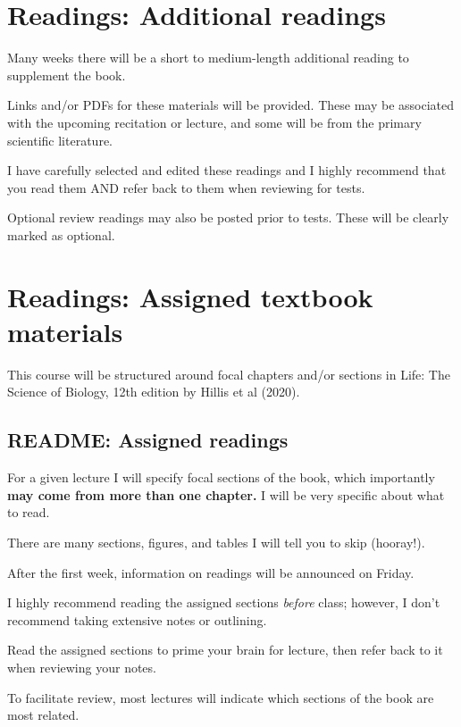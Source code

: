 \documentclass[
]{book}
\begin{document}
\hypertarget{readings-additional-readings}{%
\chapter{Readings: Additional readings}\label{readings-additional-readings}}

Many weeks there will be a short to medium-length additional reading to supplement the book.

Links and/or PDFs for these materials will be provided. These may be associated with the upcoming recitation or lecture, and some will be from the primary scientific literature.

I have carefully selected and edited these readings and I highly recommend that you read them AND refer back to them when reviewing for tests.

Optional review readings may also be posted prior to tests. These will be clearly marked as optional.

\hypertarget{textbook}{%
\chapter{Readings: Assigned textbook materials}\label{textbook}}

This course will be structured around focal chapters and/or sections in Life: The Science of Biology, 12th edition by Hillis et al (2020).

\hypertarget{readme-assigned-readings}{%
\section{README: Assigned readings}\label{readme-assigned-readings}}

For a given lecture I will specify focal sections of the book, which importantly \textbf{may come from more than one chapter.} I will be very specific about what to read.

There are many sections, figures, and tables I will tell you to skip (hooray!).

After the first week, information on readings will be announced on Friday.

I highly recommend reading the assigned sections \emph{before} class; however, I don't recommend taking extensive notes or outlining.

Read the assigned sections to prime your brain for lecture, then refer back to it when reviewing your notes.

To facilitate review, most lectures will indicate which sections of the book are most related.
\end{document}
